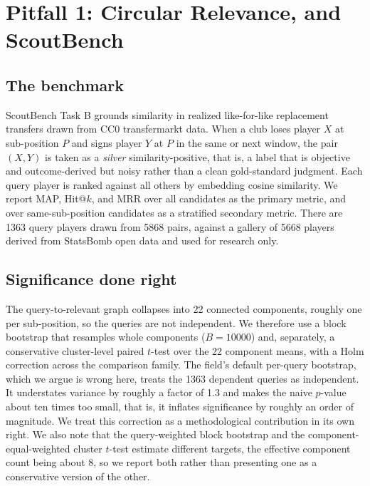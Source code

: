 \section{Pitfall 1: Circular Relevance, and ScoutBench}
\label{sec:scoutbench}

\subsection{The benchmark}
\label{sec:scoutbench-task}

ScoutBench Task B grounds similarity in realized like-for-like replacement
transfers drawn from CC0 transfermarkt data. When a club loses player $X$ at
sub-position $P$ and signs player $Y$ at $P$ in the same or next window, the
pair $(X, Y)$ is taken as a \emph{silver} similarity-positive, that is, a label
that is objective and outcome-derived but noisy rather than a clean
gold-standard judgment. Each query player is ranked against all others by
embedding cosine similarity. We report MAP, Hit@$k$, and MRR over all
candidates as the primary metric, and over same-sub-position candidates as a
stratified secondary metric. There are 1363 query players drawn from 5868
pairs, against a gallery of 5668 players derived from StatsBomb open data and
used for research only.

\subsection{Significance done right}
\label{sec:scoutbench-stats}

The query-to-relevant graph collapses into 22 connected components, roughly
one per sub-position, so the queries are not independent. We therefore use a
block bootstrap that resamples whole components ($B = 10000$) and, separately,
a conservative cluster-level paired $t$-test over the 22 component means, with
a Holm correction across the comparison family. The field's default per-query
bootstrap, which we argue is wrong here, treats the 1363 dependent queries as
independent. It understates variance by roughly a factor of 1.3 and makes the
naive $p$-value about ten times too small, that is, it inflates significance by
roughly an order of magnitude. We treat this correction as a methodological
contribution in its own right. We also note that the query-weighted block
bootstrap and the component-equal-weighted cluster $t$-test estimate different
targets, the effective component count being about 8, so we report both rather
than presenting one as a conservative version of the other.

